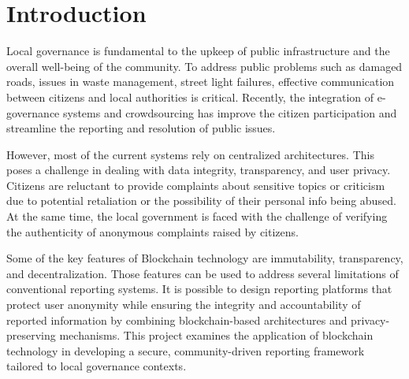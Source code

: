 \chapter{Introduction}

Local governance is fundamental to the upkeep of public infrastructure and the overall well-being of the community. To address public problems such as damaged roads, issues in waste management, street light failures, effective communication between citizens and local authorities is critical. Recently, the integration of e-governance systems and crowdsourcing has improve the citizen participation and streamline the reporting and resolution of public issues. 

However, most of the current systems rely on centralized architectures. This poses a challenge in dealing with data integrity, transparency, and user privacy. Citizens are reluctant to provide complaints about sensitive topics or criticism due to potential retaliation or the possibility of their personal info being abused. At the same time, the local government is faced with the challenge of verifying the authenticity of anonymous complaints raised by citizens.

Some of the key features of Blockchain technology are immutability, transparency, and decentralization. Those features can be used to address several limitations of conventional reporting systems. It is possible to design reporting platforms that protect user anonymity while ensuring the integrity and accountability of reported information by combining blockchain-based architectures and privacy-preserving mechanisms. This project examines the application of blockchain technology in developing a secure, community-driven reporting framework tailored to local governance contexts.


 





